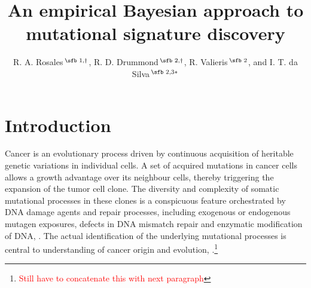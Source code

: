 \documentclass{bioinfo}
\begin{document}
\title[empirical Bayesian NMF]{An empirical Bayesian approach to
  mutational signature discovery}
\author[Rosales, R. A. and Drummond, R. D.~\textit{et~al}.]{
    R. A. Rosales\,$^{\text{\sfb 1,}\dagger}$, 
    R. D. Drummond\,$^{\text{\sfb 2,}\dagger}$, 
    R. Valieris\,$^{\text{\sfb 2}}$,  and
    I. T. da Silva\,$^{\text{\sfb 2,3}*}$} 
\address{%
   $^{\text{\sf 1}}$Departamento de Computa\c{c}\~ao e
   Matem\'atica, Universidade de S\~ao Paulo, 14040-901 SP, Brazil\\ 
   $^{\text{\sf 2}}$Laboratory of Bioinformatics and Computational 
   Biology, CIPE/A.C. Camargo Cancer Center, S\~ao Paulo  01509-010, 
   Brazil\\
   $^{\text{\sf 3}}$Laboratory of Molecular Immunology, The
   Rockefeller University, New York, NY 10065, USA\\[1em]
   {\normalsize $^{\dagger}$The authors wish it to be known
     that, in their opinion, the first two authors should be regarded
     as joint First Authors} 
}
\maketitle
\section{Introduction}
Cancer is an evolutionary process driven by continuous acquisition of
heritable genetic variations in individual cells. A set of acquired
mutations in cancer cells allows a growth advantage over its neighbour
cells, thereby triggering the expansion of the tumor cell clone. The
diversity and complexity of somatic mutational processes in these
clones is a conspicuous feature orchestrated by DNA damage agents and
repair processes, including exogenous or endogenous mutagen exposures,
defects in DNA mismatch repair and enzymatic modification of DNA,
\cite{RG}. The actual identification of the underlying mutational
processes is central to understanding of cancer origin and evolution,
\citealp{RG, AS, HEN}.\footnote{\textcolor{red}{Still have to
    concatenate this with next paragraph}}
\end{document}
